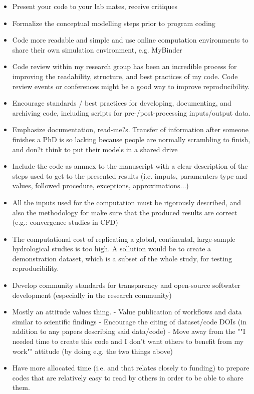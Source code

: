 \documentclass{article}
\begin{document}
\begin{itemize}
	\item Present your code to your lab mates, receive critiques
	\item Formalize the conceptual modelling steps prior to program coding
	\item Code more readable and simple and use online computation environments to share their own simulation environment, e.g. MyBinder
	\item Code review within my research group has been an incredible process for improving the readability, structure, and best practices of my code. Code review events or conferences might be a good way to improve reproducibility.
	\item Encourage standards / best practices for developing, documenting, and archiving code, including scripts for pre-/post-processing inputs/output data.
	\item Emphasize documentation, read-me?s. Transfer of information after someone finishes a PhD is so lacking because people are normally scrambling to finish, and don?t think to put their models in a shared drive
	\item Include the code as annnex to the manuscript with a clear description of the steps used to get to the presented results (i.e. imputs, paramenters type and values, followed procedure, exceptions, approximations...)
	\item All the inputs used for the computation must be rigorously described, and also the methodology for make sure that the produced results are correct (e.g.: convergence studies in CFD)
	\item The computational cost of replicating a global, continental, large-sample hydrological studies is too high. A sollution would be to create a demonstration dataset, which is a subset of the whole study, for testing reproducibility.
	\item Develop community standards for transparency and open-source softwater development (especially in the research community)
	\item Mostly an attitude  values thing. - Value publication of workflows and data similar to scientific findings - Encourage the citing of dataset/code DOIs (in addition to any papers describing said data/code) - Move away from the ""I needed time to create this code and I don't want others to benefit from my work"" attitude (by doing e.g. the two things above)
	\item Have more allocated time (i.e. and that relates closely to funding) to prepare codes that are relatively easy to read by others in order to be able to share them.

\end{itemize}
\end{document}
